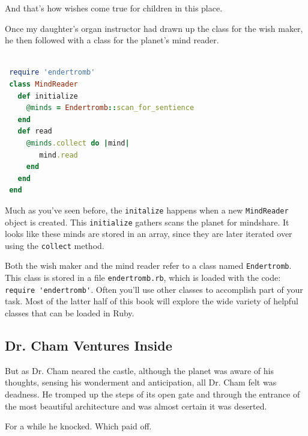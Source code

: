 \documentclass[10pt,twoside]{report}
\begin{document}
And that's how wishes come true for children in this place.

Once my daughter's organ instructor had drawn up the class for the
wish maker, he then followed with a class for the planet's mind
reader.


\begin{lstlisting}[basicstyle=\ttfamily\color{basiccolor},
    commentstyle = \ttfamily\color{commentcolor},
    keywordstyle=\ttfamily\color{keywordscolor},
    stringstyle=\color{stringcolor},
    language=Ruby,
    basicstyle=\small\ttfamily,
    showstringspaces=false,
  ]

 require 'endertromb'
 class MindReader
   def initialize
     @minds = Endertromb::scan_for_sentience
   end
   def read
     @minds.collect do |mind|
        mind.read
     end
   end
 end

\end{lstlisting}


Much as you've seen before, the \lstinline[breaklines=true]|initalize|
happens when a new \lstinline[breaklines=true]|MindReader| object is
created. This \lstinline[breaklines=true]|initialize| gathers scans
the planet for mindshare.  It looks like these minds are stored in an
array, since they are later iterated over using the
\lstinline[breaklines=true]|collect| method.

Both the wish maker and the mind reader refer to a class named
\lstinline[breaklines=true]|Endertromb|.  This class is stored in a
file \lstinline[breaklines=true]|endertromb.rb|, which is loaded with
the code: \lstinline[breaklines=true]|require 'endertromb'|. Often
you'll use other classes to accomplish part of your task.  Most of the
latter half of this book will explore the wide variety of helpful
classes that can be loaded in Ruby.



\subsection{Dr. Cham Ventures Inside}



But as Dr. Cham neared the castle, although the planet was aware of
his thoughts, sensing his wonderment and anticipation, all Dr. Cham
felt was deadness.  He tromped up the steps of its open gate and
through the entrance of the most beautiful architecture and was almost
certain it was deserted.

For a while he knocked.  Which paid off.
\end{document}
